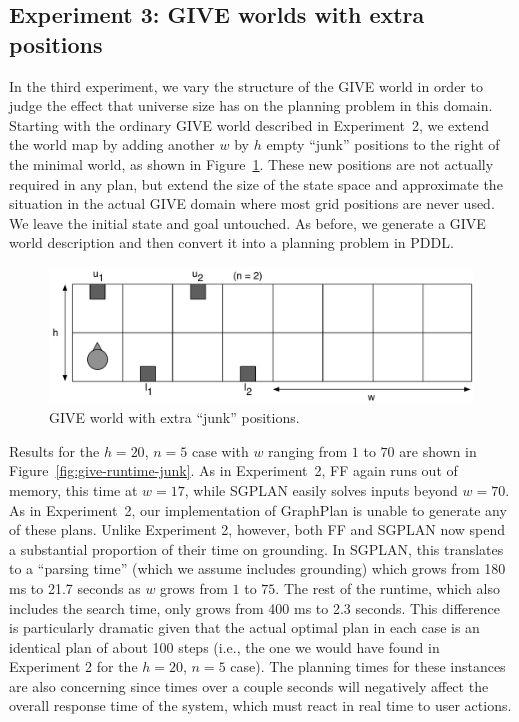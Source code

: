 \subsection{Experiment 3: GIVE worlds with extra positions}
\label{sec:experiment-3:-give}

In the third experiment, we vary the structure of the GIVE world in order
to judge the effect that universe size has on the planning problem in this
domain. Starting with the ordinary GIVE world described in Experiment~2, we
extend the world map by adding another $w$ by $h$ empty ``junk'' positions
to the right of the minimal world, as shown in Figure~\ref{fig:give-junk}.
These new positions are not actually required in any plan, but extend the
size of the state space and approximate the situation in the actual GIVE
domain where most grid positions are never used. We leave the initial state
and goal untouched. As before, we generate a GIVE world description and
then convert it into a planning problem in PDDL.

\begin{figure}[t]
  \centering
  \includegraphics[width=0.80\columnwidth]{pic-empty-buttons}
  \caption{GIVE world with extra ``junk'' positions.}
  \label{fig:give-junk}
\end{figure}

Results for the $h=20$, $n=5$ case with $w$ ranging from $1$ to $70$ are
shown in Figure~\ref{fig:give-runtime-junk}. As in Experiment~2, FF again
runs out of memory, this time at $w=17$, while SGPLAN easily solves inputs
beyond $w=70$. As in Experiment~2, our implementation of GraphPlan is
unable to generate any of these plans. Unlike Experiment 2, however, both
FF and SGPLAN now spend a substantial proportion of their time on
grounding. In SGPLAN, this translates to a ``parsing time'' (which we
assume includes grounding) which grows from 180 ms to 21.7 seconds as $w$
grows from $1$ to $75$. The rest of the runtime, which also includes the
search time, only grows from 400 ms to 2.3 seconds. This difference is
particularly dramatic given that the actual optimal plan in each case is an
identical plan of about 100 steps (i.e., the one we would have found in
Experiment 2 for the $h=20$, $n=5$ case). The planning times for these
instances are also concerning since times over a couple seconds will
negatively affect the overall response time of the system, which must react
in real time to user actions.

